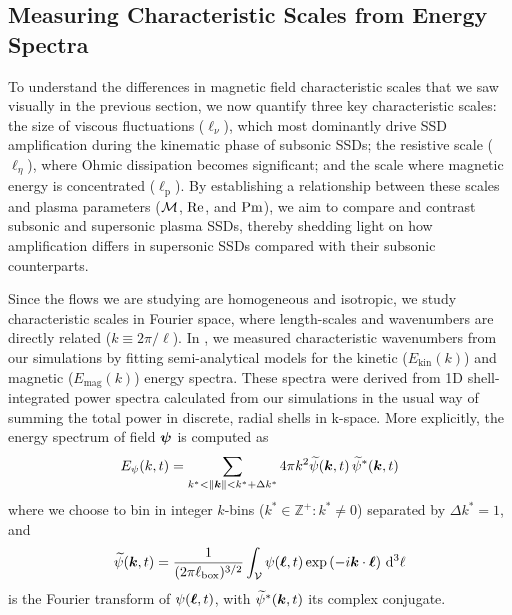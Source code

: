 \subsection{Measuring Characteristic Scales from Energy Spectra}
\label{sec:results:tools}

To understand the differences in magnetic field characteristic scales that we saw visually in the previous section, we now quantify three key characteristic scales: the size of viscous fluctuations ($\ell_\nu$), which most dominantly drive SSD amplification during the kinematic phase of subsonic SSDs; the resistive scale ($\ell_\eta$), where Ohmic dissipation becomes significant; and the scale where magnetic energy is concentrated ($\ell_\mathrm{p}$). By establishing a relationship between these scales and plasma parameters (\eg $\mathcal{M}$, $\mathrm{Re}$, and $\mathrm{Pm}$), we aim to compare and contrast subsonic and supersonic plasma SSDs, thereby shedding light on how amplification differs in supersonic SSDs compared with their subsonic counterparts.

Since the flows we are studying are homogeneous and isotropic, we study characteristic scales in Fourier space, where length-scales and wavenumbers are directly related ($k \equiv 2\pi / \ell$). In , we measured characteristic wavenumbers from our simulations by fitting semi-analytical models for the kinetic ($E_\mathrm{kin}(k)$) and magnetic ($E_\mathrm{mag}(k)$) energy spectra. These spectra were derived from 1D shell-integrated power spectra calculated from our simulations in the usual way of summing the total power in discrete, radial shells in k-space. More explicitly, the energy spectrum of field $\bm{\psi}$ is computed as
\begin{align}
    E_\psi(k, t)
        = \sum_{k^* < \|\bm{k}\| < k^* + \Delta k^*}
            4\pi k^2 \widetilde{\psi}(\bm{k}, t) \, \widetilde{\psi}^*(\bm{k}, t)
\end{align}
where we choose to bin in integer $k$-bins ($k^* \in \mathds{Z}^+ : k^* \ne 0$) separated by $\Delta k^* = 1$, and
\begin{align}
    \widetilde{\psi}(\bm{k}, t)
        = \frac{1}{(2 \pi \ell_\mathrm{box})^{3/2}} \int_{\mathcal{V}} \psi(\bm{\ell}, t) \exp\left( -i \bm{k}\cdot\bm{\ell} \right) \,\mathrm{d} ^3 \ell
        \label{eqn:kin_fourier}
\end{align}
is the Fourier transform of $\psi(\bm{\ell}, t)$, with $\widetilde{\psi}^*(\bm{k}, t)$ its complex conjugate.

